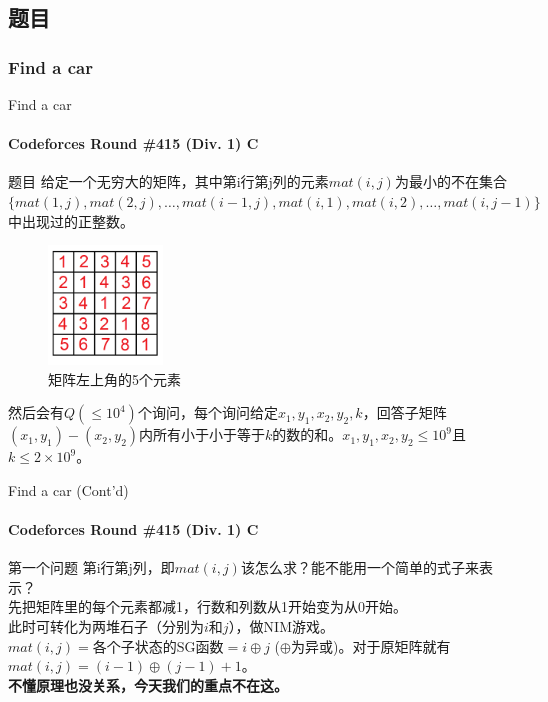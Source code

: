 \documentclass[hyperref={unicode=true}]{beamer}
\theoremstyle{definition}
\theoremstyle{proof}
\begin{document}
\subsection{题目}
\subsubsection{Find a car}
\begin{frame}{Find a car}\framesubtitle{Codeforces Round \#415 (Div. 1) C}
  \begin{block}{题目}
    给定一个无穷大的矩阵，其中第i行第j列的元素$mat(i,j)$为最小的不在集合$\{mat(1,j),mat(2,j),\ldots,mat(i-1,j), mat(i,1), mat(i,2), \ldots,mat(i,j-1)\}$中出现过的正整数。
    \begin{minipage}{0.45\linewidth}
      \begin{figure}
        \centering
        \includegraphics[width=1.2in]{figures/upper5.png}
        \caption{矩阵左上角的5个元素}\label{fig:upper5}
      \end{figure}
    \end{minipage}
    \begin{minipage}{0.45\linewidth}
      然后会有$Q(\leq 10^4)$个询问，每个询问给定$x_1,y_1,x_2,y_2,k$，回答子矩阵$(x_1,y_1)-(x_2,y_2)$内所有小于小于等于$k$的数的和。$x_1,y_1,x_2,y_2\leq 10^9$且$k\leq2\times 10^9$。
    \end{minipage}
  \end{block}
\end{frame}

\begin{frame}{Find a car (Cont'd)}\framesubtitle{Codeforces Round \#415 (Div. 1) C}
  \begin{alertblock}{第一个问题}
    第i行第j列，即$mat(i,j)$该怎么求？能不能用一个简单的式子来表示？\\
    \pause{}先把矩阵里的每个元素都减1，行数和列数从1开始变为从0开始。\\
    \pause{}此时可转化为两堆石子（分别为$i$和$j$），做NIM游戏。$mat(i,j)=\text{各个子状态的SG函数}=i \oplus j$ ($\oplus$为异或)。对于原矩阵就有$mat(i,j)=(i-1)\oplus (j-1) + 1$。\\
    {\bf 不懂原理也没关系，今天我们的重点不在这。}
  \end{alertblock}
\end{frame}
\end{document}
